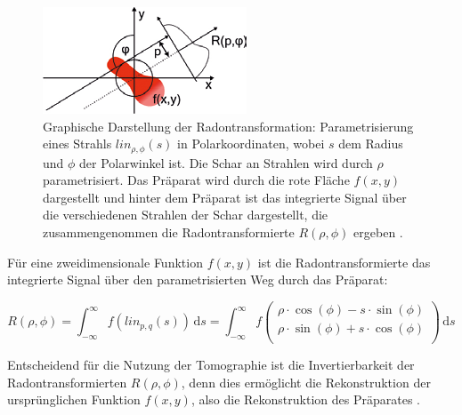 \begin{figure}
	\centering
\includegraphics[width=0.6\linewidth]{IMAGE/radon.png}
	\caption{Graphische Darstellung der Radontransformation: Parametrisierung eines Strahls $lin_{\rho,\phi}(s)$ in Polarkoordinaten, wobei $s$ dem Radius und $\phi$ der Polarwinkel ist. Die Schar an Strahlen wird durch $\rho$ parametrisiert.
Das Präparat wird durch die rote Fläche $f(x,y)$ dargestellt und hinter dem Präparat ist das integrierte Signal über die verschiedenen Strahlen der Schar dargestellt, die zusammengenommen die Radontransformierte $R(\rho, \phi)$ ergeben \cite{slot_paper}.}
	\label{fig:radon}
\end{figure}

Für eine zweidimensionale Funktion $f(x,y)$ ist die Radontransformierte das integrierte Signal über den parametrisierten Weg durch das Präparat:

\begin{equation}
R(\rho,\phi) = \int_{- \infty}^{\infty} f(lin_{p,q}(s)) \,\mathrm{d}s
=
\int_{- \infty}^{\infty} f\begin{pmatrix}
\rho \cdot \cos(\phi) - s \cdot \sin(\phi) \\
\rho \cdot \sin(\phi) + s \cdot \cos(\phi) \\
\end{pmatrix} \,\mathrm{d}s
\end{equation}

Entscheidend für die Nutzung der Tomographie ist die Invertierbarkeit der Radontransformierten $R(\rho,\phi)$, denn dies ermöglicht die Rekonstruktion der ursprünglichen Funktion $f(x,y)$, also die Rekonstruktion des Präparates \cite{slot_paper}.

